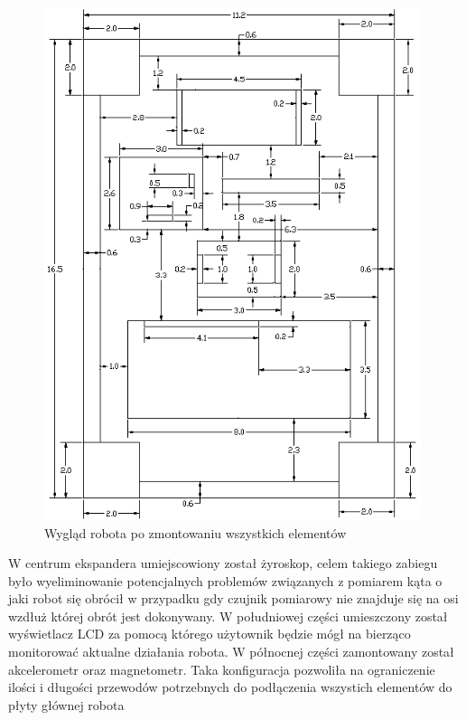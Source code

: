 \begin{figure}[h!]
 \centering
 \includegraphics[height=150mm]{../images/ch04/sensor_board.png}
 \caption{Wygląd robota po zmontowaniu wszystkich elementów}
 \label{fig:SensorsBoard}
\end{figure}

W centrum ekspandera umiejscowiony został żyroskop, celem takiego zabiegu było
wyeliminowanie potencjalnych problemów związanych z pomiarem kąta o jaki robot
się obrócił w przypadku gdy czujnik pomiarowy nie znajduje się na osi wzdłuż
której obrót jest dokonywany. W południowej części umieszczony został
wyświetlacz LCD za pomocą którego użytownik będzie mógł na bierząco monitorować
aktualne działania robota. W północnej części zamontowany został akcelerometr
oraz magnetometr. Taka konfiguracja pozwoliła na ograniczenie ilości i długości
przewodów potrzebnych do podłączenia wszystich elementów do płyty głównej robota
